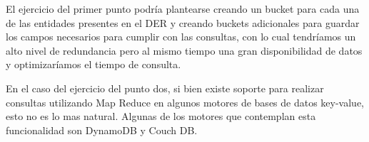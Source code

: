 El ejercicio del primer punto podr\'ia plantearse creando un bucket para cada una de las entidades presentes en el DER y creando buckets adicionales para guardar los campos necesarios para cumplir con las consultas, con lo cual tendr\'iamos un alto nivel de redundancia pero al mismo tiempo una gran disponibilidad de datos y optimizar\'iamos el tiempo de consulta.

En el caso del ejercicio del punto dos, si bien existe soporte para realizar consultas utilizando Map Reduce en algunos motores de bases de datos key-value, esto no es lo mas natural. Algunas de los motores que contemplan esta funcionalidad son DynamoDB y Couch DB.



